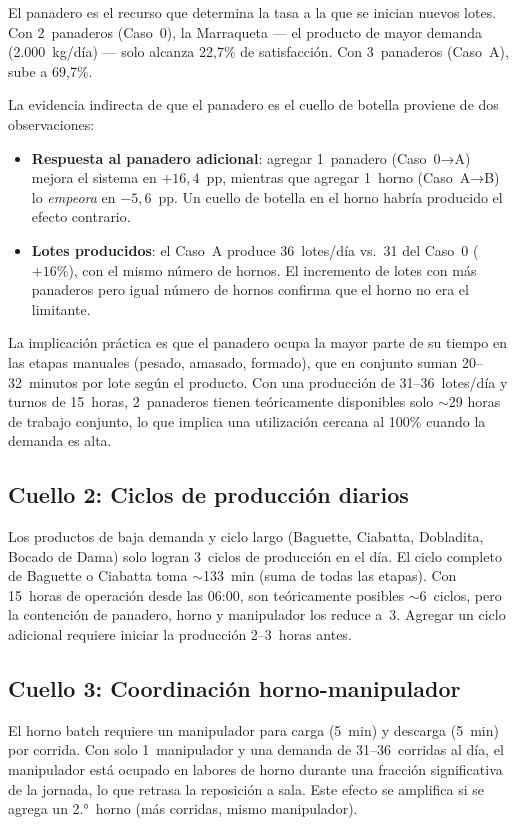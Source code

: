 \documentclass[12pt]{article}
\begin{document}
El panadero es el recurso que determina la tasa a la que se inician nuevos lotes. Con 2~panaderos (Caso~0), la Marraqueta --- el producto de mayor demanda (2.000~kg/día) --- solo alcanza 22,7\% de satisfacción. Con 3~panaderos (Caso~A), sube a 69,7\%.

La evidencia indirecta de que el panadero es el cuello de botella proviene de dos observaciones:
\begin{itemize}
  \item \textbf{Respuesta al panadero adicional}: agregar 1~panadero (Caso~0→A) mejora el sistema en $+16,4$~pp, mientras que agregar 1~horno (Caso~A→B) lo \emph{empeora} en $-5,6$~pp. Un cuello de botella en el horno habría producido el efecto contrario.
  \item \textbf{Lotes producidos}: el Caso~A produce 36~lotes/día vs.\ 31 del Caso~0 ($+16\%$), con el mismo número de hornos. El incremento de lotes con más panaderos pero igual número de hornos confirma que el horno no era el limitante.
\end{itemize}

La implicación práctica es que el panadero ocupa la mayor parte de su tiempo en las etapas manuales (pesado, amasado, formado), que en conjunto suman 20--32~minutos por lote según el producto. Con una producción de 31--36~lotes/día y turnos de 15~horas, 2~panaderos tienen teóricamente disponibles solo $\sim$29 horas de trabajo conjunto, lo que implica una utilización cercana al 100\% cuando la demanda es alta.

\subsection{Cuello 2: Ciclos de producción diarios}

Los productos de baja demanda y ciclo largo (Baguette, Ciabatta, Dobladita, Bocado de Dama) solo logran 3~ciclos de producción en el día. El ciclo completo de Baguette o Ciabatta toma $\sim$133~min (suma de todas las etapas). Con 15~horas de operación desde las 06:00, son teóricamente posibles $\sim$6~ciclos, pero la contención de panadero, horno y manipulador los reduce a~3. Agregar un ciclo adicional requiere iniciar la producción 2--3~horas antes.

\subsection{Cuello 3: Coordinación horno-manipulador}

El horno batch requiere un manipulador para carga (5~min) y descarga (5~min) por corrida. Con solo 1~manipulador y una demanda de 31--36~corridas al día, el manipulador está ocupado en labores de horno durante una fracción significativa de la jornada, lo que retrasa la reposición a sala. Este efecto se amplifica si se agrega un 2.°~horno (más corridas, mismo manipulador).
\end{document}
